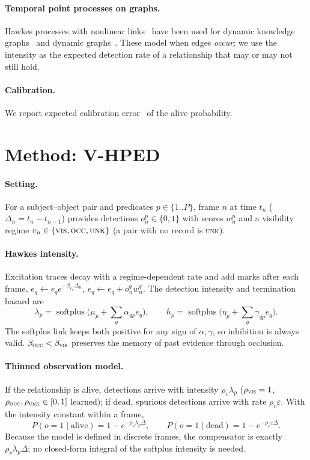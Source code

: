 \documentclass[10pt]{article}
\newcommand{\softplus}{\operatorname{softplus}}
\begin{document}
\paragraph{Temporal point processes on graphs.} Hawkes processes with
nonlinear links~\cite{mei2017neuralhawkes} have been used for dynamic
knowledge graphs~\cite{trivedi2017knowevolve} and dynamic
graphs~\cite{trivedi2019dyrep}. These model when edges \emph{occur}; we use
the intensity as the expected detection rate of a relationship that may or
may not still hold.
\paragraph{Calibration.} We report expected calibration error~\cite{guo2017calibration}
of the alive probability.

\section{Method: V-HPED}
\label{sec:method}
\paragraph{Setting.} For a subject--object pair and predicates
$p\in\{1..P\}$, frame $n$ at time $t_n$ ($\Delta_n=t_n-t_{n-1}$) provides
detections $o_n^p\in\{0,1\}$ with scores $w_n^p$ and a visibility regime
$v_n\in\{\textsc{vis},\textsc{occ},\textsc{unk}\}$ (a pair with no record is
\textsc{unk}).

\paragraph{Hawkes intensity.} Excitation traces decay with a
regime-dependent rate and add marks after each frame,
$e_q \leftarrow e_q e^{-\beta_{v_n}\Delta_n}$, $e_q \leftarrow e_q + o_n^q w_n^q$.
The detection intensity and termination hazard are
\begin{equation}
\lambda_p=\softplus\Big(\mu_p+\sum_q \alpha_{qp} e_q\Big),\qquad
h_p=\softplus\Big(\eta_p+\sum_q \gamma_{qp} e_q\Big).
\end{equation}
The softplus link keeps both positive for any sign of $\alpha,\gamma$, so
inhibition is always valid. $\beta_{\textsc{occ}}<\beta_{\textsc{vis}}$
preserves the memory of past evidence through occlusion.

\paragraph{Thinned observation model.} If the relationship is alive,
detections arrive with intensity $\rho_v\lambda_p$ ($\rho_{\textsc{vis}}=1$,
$\rho_{\textsc{occ}},\rho_{\textsc{unk}}\in[0,1]$ learned); if dead,
spurious detections arrive with rate $\rho_v\varepsilon$. With the intensity
constant within a frame,
\begin{equation}
P(o=1\mid\text{alive})=1-e^{-\rho_v\lambda_p\Delta},\qquad
P(o=1\mid\text{dead})=1-e^{-\rho_v\varepsilon\Delta}.
\end{equation}
Because the model is defined in discrete frames, the compensator is exactly
$\rho_v\lambda_p\Delta$; no closed-form integral of the softplus intensity is
needed.
\end{document}
